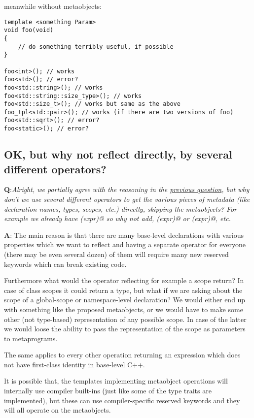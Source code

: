 meanwhile without metaobjects:

\begin{verbatim}
template <something Param>
void foo(void)
{
	// do something terribly useful, if possible
}

foo<int>(); // works
foo<std>(); // error?
foo<std::string>(); // works
foo<std::string::size_type>(); // works
foo<std::size_t>(); // works but same as the above
foo_tpl<std::pair>(); // works (if there are two versions of foo)
foo<std::sqrt>(); // error?
foo<static>(); // error?
\end{verbatim}

\subsection{OK, but why not reflect directly, by several different operators?}

{\textbf Q:}{\em Alright, we partially agree with the reasoning in the
\hyperref[faq-why-metaobjects]{previous question}, but why don't we use several
different operators to get the various pieces of metadata (like declaration names,
types, scopes, etc.) directly, skipping the metaobjects?
For example we already have \verb@decltype(expr)@ so why not add,
\verb@declname(expr)@ or \verb@declscope(expr)@, etc.}

{\textbf A:} The main reason is that there are many base-level declarations
with various properties which we want to reflect and having a separate
operator for everyone (there may be even several dozen) of them
will require many new reserved keywords which can break existing code.

Furthermore what would the operator reflecting for example a scope return?
In case of class scopes it could return a type, but what if we are asking
about the scope of a global-scope or namespace-level declaration? We would
either end up with something like the proposed metaobjects,
or we would have to make some other (not type-based) representation of any
possible scope.
In case of the latter we would loose the ability to pass the representation
of the scope as parameters to metaprograms.

The same applies to every other operation returning an expression which does
not have first-class identity in base-level C++.

It is possible that, the templates implementing metaobject operations
will internally use compiler built-ins (just like some of the type traits
are implemented), but these can use compiler-specific reserved keywords
and they will all operate on the metaobjects.


